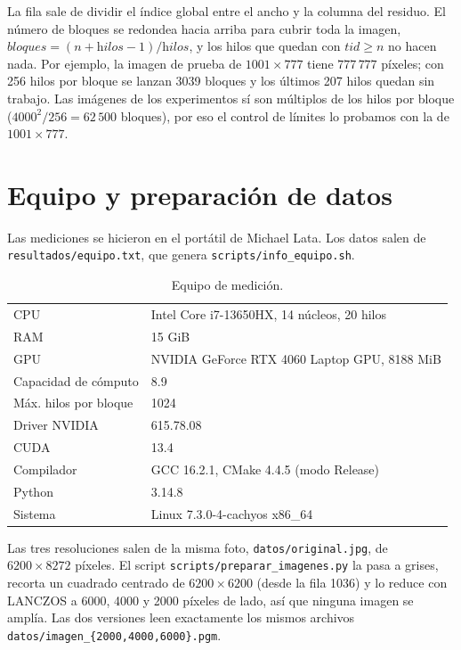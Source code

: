 \documentclass[12pt]{article}
\begin{document}
La fila sale de dividir el índice global entre el ancho y la columna del residuo. El número de
bloques se redondea hacia arriba para cubrir toda la imagen,
$\textit{bloques} = (n + \textit{hilos} - 1) / \textit{hilos}$, y los hilos que quedan con
$\textit{tid} \ge n$ no hacen nada. Por ejemplo, la imagen de prueba de $1001\times777$ tiene
$777\,777$ píxeles; con 256 hilos por bloque se lanzan 3039 bloques y los últimos 207 hilos
quedan sin trabajo. Las imágenes de los experimentos sí son múltiplos de los hilos por bloque
($4000^2/256 = 62\,500$ bloques), por eso el control de límites lo probamos con la de
$1001\times777$.

\section{Equipo y preparación de datos}

Las mediciones se hicieron en el portátil de Michael Lata. Los datos salen de
\texttt{resultados/equipo.txt}, que genera \texttt{scripts/info\_equipo.sh}.

\begin{table}[H]
\centering
\caption{Equipo de medición.}
\begin{tabular}{ll}
\toprule
CPU & Intel Core i7-13650HX, 14 núcleos, 20 hilos \\
RAM & 15 GiB \\
GPU & NVIDIA GeForce RTX 4060 Laptop GPU, 8188 MiB \\
Capacidad de cómputo & 8.9 \\
Máx. hilos por bloque & 1024 \\
Driver NVIDIA & 615.78.08 \\
CUDA & 13.4 \\
Compilador & GCC 16.2.1, CMake 4.4.5 (modo Release) \\
Python & 3.14.8 \\
Sistema & Linux 7.3.0-4-cachyos x86\_64 \\
\bottomrule
\end{tabular}
\end{table}

Las tres resoluciones salen de la misma foto, \texttt{datos/original.jpg}, de
$6200\times8272$ píxeles. El script \texttt{scripts/preparar\_imagenes.py} la pasa a grises,
recorta un cuadrado centrado de $6200\times6200$ (desde la fila 1036) y lo reduce con LANCZOS a
6000, 4000 y 2000 píxeles de lado, así que ninguna imagen se amplía. Las dos versiones leen
exactamente los mismos archivos \texttt{datos/imagen\_\{2000,4000,6000\}.pgm}.
\end{document}
